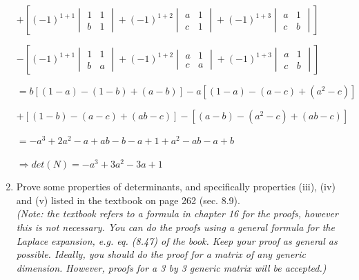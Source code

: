 \documentclass[fleqn]{article}
\begin{document}
\begin{enumerate}
      $
      +\left[(-1)^{1+1}
      \begin{vmatrix}
        1 & 1 \\
        b & 1
      \end{vmatrix}
      +(-1)^{1+2}
      \begin{vmatrix}
        a & 1 \\
        c & 1
      \end{vmatrix}
      +(-1)^{1+3}
      \begin{vmatrix}
        a & 1 \\
        c & b
      \end{vmatrix}
      \right]
      $

      $-\left[(-1)^{1+1}
      \begin{vmatrix}
        1 & 1 \\
        b & a
      \end{vmatrix}
      +(-1)^{1+2}
      \begin{vmatrix}
        a & 1 \\
        c & a 
      \end{vmatrix}
      +(-1)^{1+3}
      \begin{vmatrix}
        a & 1 \\
        c & b
      \end{vmatrix}
      \right]
      $

      \bigbreak

      $=b\left[(1-a)-(1-b)+(a-b)\right]-a\left[(1-a)-(a-c)+(a^2-c)\right]$

      $+\left[(1-b)-(a-c)+(ab-c)\right]-\left[(a-b)-(a^2-c)+(ab-c)\right]$

      \bigbreak

      $=-a^3+2a^2-a+ab-b-a+1+a^2-ab-a+b$

      $
      \Longrightarrow
      det(N)=-a^3+3a^2-3a+1
      $


    \item Prove some properties of determinants, and specifically properties (iii), (iv) and (v) listed in the textbook on page 262 (sec. 8.9). \\
    \emph{(Note: the textbook refers to a formula in chapter 16 for the proofs, however this is not necessary. You can do the proofs using a general formula for the Laplace expansion, e.g. eq. (8.47) of the book. Keep your proof as general as possible. Ideally, you should do the proof for a matrix of any generic dimension. However, proofs for a 3 by 3 generic matrix will be accepted.) }



\end{enumerate}
\end{document}
